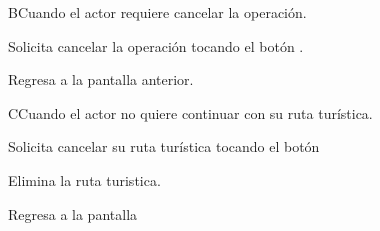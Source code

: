 	\begin{UCtrayectoriaA}{B}{Cuando el actor requiere cancelar la operación.}
		
		\UCpaso [\UCactor] Solicita cancelar la operación tocando el botón .
		
		\UCpaso Regresa a la pantalla anterior.
		
	\end{UCtrayectoriaA}

	\begin{UCtrayectoriaA}{C}{Cuando el actor no quiere continuar con su ruta turística.}
		
		\UCpaso [\UCactor] Solicita cancelar su ruta turística tocando el botón 
		
		\UCpaso Elimina la ruta turistica.
		
		\UCpaso Regresa a la pantalla 
		
	\end{UCtrayectoriaA}
	
	